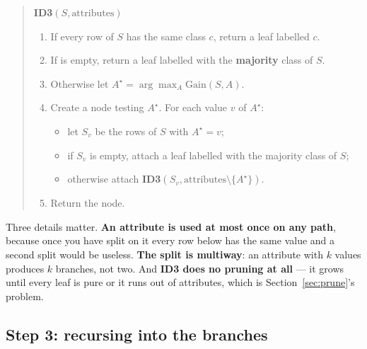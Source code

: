 \documentclass[11pt]{article}
\begin{document}
\begin{quote}
\textbf{ID3}$(S, \text{attributes})$
\begin{enumerate}[leftmargin=1.6em,itemsep=1pt]
  \item If every row of $S$ has the same class $c$, return a leaf labelled $c$.
  \item If  is empty, return a leaf labelled with the
    \textbf{majority} class of $S$.
  \item Otherwise let $A^\star = \arg\max_A \mathrm{Gain}(S, A)$.
  \item Create a node testing $A^\star$. For each value $v$ of $A^\star$:
    \begin{itemize}[leftmargin=1.2em,itemsep=0pt]
      \item let $S_v$ be the rows of $S$ with $A^\star = v$;
      \item if $S_v$ is empty, attach a leaf labelled with the majority class
        of $S$;
      \item otherwise attach
        \textbf{ID3}$(S_v, \text{attributes} \setminus \{A^\star\})$.
    \end{itemize}
  \item Return the node.
\end{enumerate}
\end{quote}

Three details matter. \textbf{An attribute is used at most once on any path},
because once you have split on it every row below has the same value and a
second split would be useless. \textbf{The split is multiway}: an attribute
with $k$ values produces $k$ branches, not two. And \textbf{ID3 does no
pruning at all} --- it grows until every leaf is pure or it runs out of
attributes, which is Section~\ref{sec:prune}'s problem.

\subsection{Step 3: recursing into the branches}
\end{document}
